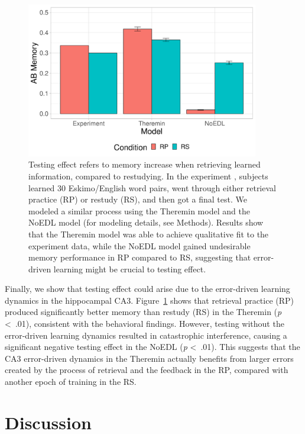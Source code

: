 \documentclass[11pt,twoside]{article}
\newif\myifpdf
\begin{document}
\begin{figure}
  \centering\includegraphics[width=4in]{fig_hip_edl_testingeffect}
  \caption{\footnotesize Testing effect refers to memory increase when retrieving learned information, compared to restudying.  In the experiment \citep{CarrierPashler92}, subjects learned 30 Eskimo/English word pairs, went through either retrieval practice (RP) or restudy (RS), and then got a final test.  We modeled a similar process using the Theremin model and the NoEDL model (for modeling details, see Methods).  Results show that the Theremin model was able to achieve qualitative fit to the experiment data, while the NoEDL model gained undesirable memory performance in RP compared to RS, suggesting that error-driven learning might be crucial to testing effect.}
\label{fig.testingeffect}
\end{figure}

Finally, we show that testing effect could arise due to the error-driven learning dynamics in the hippocampal CA3.  Figure~\ref{fig.testingeffect} shows that retrieval practice (RP) produced significantly better memory than restudy (RS) in the Theremin (\emph{p} \textless \ .01), consistent with the behavioral findings.  However, testing without the error-driven learning dynamics resulted in catastrophic interference, causing a significant negative testing effect in the NoEDL (\emph{p} \textless \ .01).  This suggests that the CA3 error-driven dynamics in the Theremin actually benefits from larger errors created by the process of retrieval and the feedback in the RP, compared with another epoch of training in the RS.  

\section{Discussion}
\end{document}
